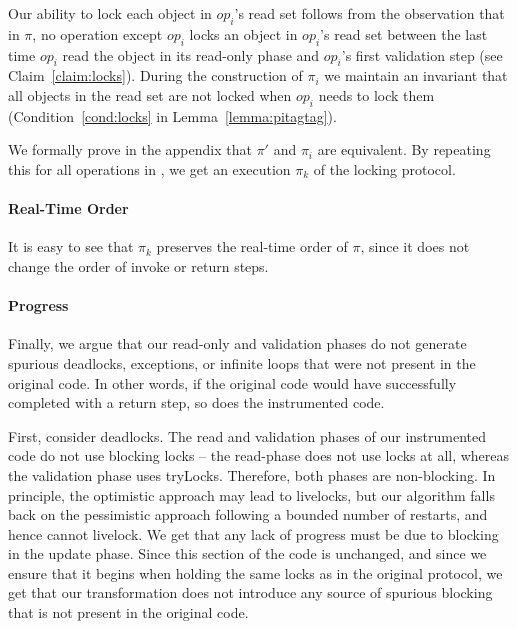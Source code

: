 {Our ability to lock each object in $op_i$'s read set follows from the
observation that in $\pi$, no operation except $op_i$ locks an object in
$op_i$'s read set between the last time $op_i$ read the object in its
read-only phase and $op_i$'s first validation step (see Claim~\ref{claim:locks}).
During the construction of $\pi_i$ we maintain
an invariant that all objects in the read set are not locked when $op_i$ needs
to lock them (Condition~\ref{cond:locks} in Lemma~\ref{lemma:pitagtag}).


We formally prove in the appendix that $\pi'$ and $\pi_i$ are equivalent.
By repeating this for all operations in \op, we get an execution $\pi_k$ of the locking protocol.

\paragraph{Real-Time Order}
It is easy to see that $\pi_k$ preserves the real-time order of $\pi$, since it does not change the order of invoke or return steps.
}

\paragraph{Progress}
Finally, we argue that our read-only and validation phases do not generate spurious deadlocks, exceptions,
or infinite loops that were not present in the original code. In other words, if the original code would have
successfully completed with a return step, so does the instrumented code.

First, consider deadlocks.
The read and validation phases of our instrumented code do not use blocking locks -- the read-phase does not use locks at all, whereas the
validation phase uses tryLocks. Therefore, both phases are non-blocking. In principle, the optimistic approach may lead to livelocks, but
our algorithm falls back on the pessimistic approach following a bounded number of restarts, and hence cannot livelock.
We get that any lack
of progress must be due to blocking in the update phase. Since this section of the code is unchanged, and
since we ensure that it begins when holding the same locks as in the original protocol, we get that our transformation does not introduce any
source of spurious blocking that is not present in the original  code.

